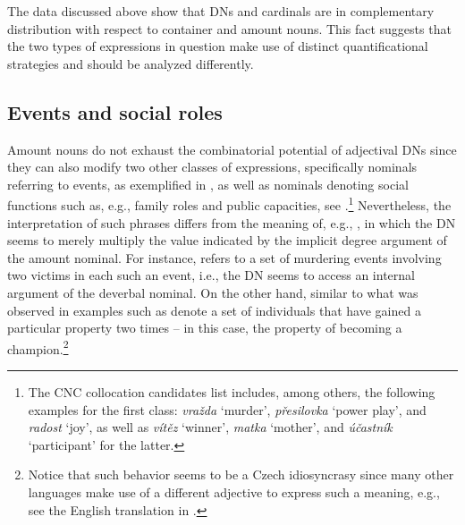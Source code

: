 \documentclass[output=paper,
modfonts,
hidelinks,
newtxmath
]{langscibook}
\begin{document}
\ea {}
\z \z

\noindent The data discussed above show that DNs and cardinals are in complementary distribution with respect to container and amount nouns. This fact suggests that the two types of expressions in question make use of distinct quantificational strategies and should be analyzed differently.

\subsection{Events and social roles}\label{events-and-social-roles}

Amount nouns do not exhaust the combinatorial potential of adjectival DNs since they can also modify two other classes of expressions, specifically nominals referring to events, as exemplified in , as well as nominals denoting social functions such as, e.g., family roles and public capacities, see .\footnote{The CNC collocation candidates list includes, among others, the following examples for the first class: \textit{vražda} `murder', \textit{přesilovka} `power play', and \textit{radost} `joy', as well as \textit{vítěz} `winner', \textit{matka} `mother', and \textit{účastník} `participant' for the latter.} Nevertheless, the interpretation of such phrases differs from the meaning of, e.g., , in which the DN seems to merely multiply the value indicated by the implicit degree argument of the amount nominal. For instance,  refers to a set of murdering events involving two victims in each such an event, i.e., the DN seems to access an internal argument of the deverbal nominal. On the other hand, similar to what was observed in \citet{wagiel2015multiplicative} examples such as  denote a set of individuals that have gained a particular property two times -- in this case, the property of becoming a champion.\footnote{Notice that such behavior seems to be a Czech idiosyncrasy since many other languages make use of a different adjective to express such a meaning, e.g., see the English translation in .}
\end{document}
